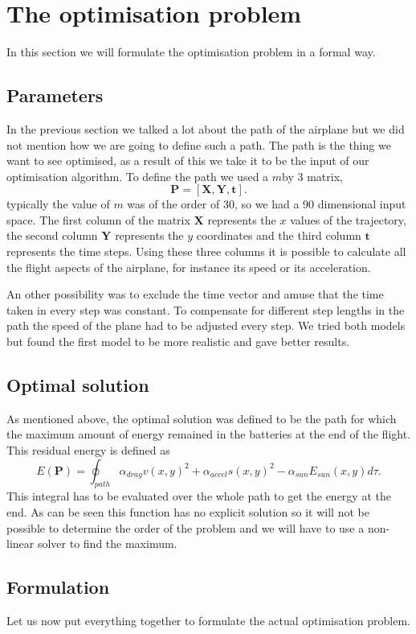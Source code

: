 \section{The optimisation problem}

In this section we will formulate the optimisation problem in a formal way.
\subsection{Parameters}

In the previous section we talked a lot about the path of the airplane but we did not mention how we are going to define such a path.
The path is the thing we want to see optimised, as a result of this we take it to be the input of our optimisation algorithm.
To define the path we used a $ m $by 3 matrix, 
\begin{equation}
\mathbf{P} = \left[\mathbf{X},\mathbf{Y},\mathbf{t} \right] .
\end{equation}
typically the value of $ m $ was of the order of 30, so we had a 90 dimensional input space.
The first column of the matrix $ \mathbf{X} $ represents the $ x $ values of the trajectory, the second column $ \mathbf{Y} $ represents the $ y $ coordinates and the third column $ \mathbf{t}  $ represents the time steps.
Using these three columns it is possible to calculate all the flight aspects of the airplane, for instance its speed or its acceleration.

An other possibility was to exclude the time vector and amuse that the time taken in every step was constant.
To compensate for different step lengths in the path  the  speed of the plane had to be adjusted every step.
We tried both models but found the first model to be more realistic and gave  better results.

\subsection{Optimal solution}

As mentioned above, the optimal solution was defined to be the path for which the maximum amount of energy remained in the batteries at the end of the flight.
This residual  energy is defined as
\begin{equation}
E(\mathbf{P}) = \oint_{path} \alpha_{drag}v(x,y)^2  + \alpha_{accel}  s(x,y)^2   -\alpha_{sun} E_{sun}(x,y)  d\tau.
\end{equation}
This integral has to be evaluated over the whole path to get the energy at the end.
As  can be seen this function has no explicit solution so it will not be possible to determine the order of the problem and we will have to use a non-linear solver to find the maximum.

\subsection{Formulation}

Let us now put everything together to formulate the actual optimisation problem.
